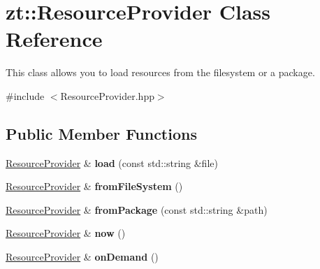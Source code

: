 \hypertarget{classzt_1_1_resource_provider}{}\section{zt\+:\+:Resource\+Provider Class Reference}
\label{classzt_1_1_resource_provider}


This class allows you to load resources from the filesystem or a package.  




{\ttfamily \#include $<$Resource\+Provider.\+hpp$>$}

\subsection*{Public Member Functions}
\begin{DoxyCompactItemize}
\item 
\mbox{\label{classzt_1_1_resource_provider_a377d158f908a51223c9c42f262333ba0}} 
\hyperlink{classzt_1_1_resource_provider}{Resource\+Provider} \& {\bfseries load} (const std\+::string \&file)
\item 
\mbox{\label{classzt_1_1_resource_provider_a4cd1f6c58eef9685bd6ffc761f82168c}} 
\hyperlink{classzt_1_1_resource_provider}{Resource\+Provider} \& {\bfseries from\+File\+System} ()
\item 
\mbox{\label{classzt_1_1_resource_provider_aebac197b2ed0b1d95ae366a0732da9ce}} 
\hyperlink{classzt_1_1_resource_provider}{Resource\+Provider} \& {\bfseries from\+Package} (const std\+::string \&path)
\item 
\mbox{\label{classzt_1_1_resource_provider_aa74e82606ac01a1cc1077fac6a7865ea}} 
\hyperlink{classzt_1_1_resource_provider}{Resource\+Provider} \& {\bfseries now} ()
\item 
\mbox{\label{classzt_1_1_resource_provider_ac080a462bf92e2d12a4ad15c90e1c182}} 
\hyperlink{classzt_1_1_resource_provider}{Resource\+Provider} \& {\bfseries on\+Demand} ()
\item 
\mbox{\label{classzt_1_1_resource_provider_aedd409bf8d7bc826d04f8b7750cbd75d}} 

\end{DoxyCompactItemize}
